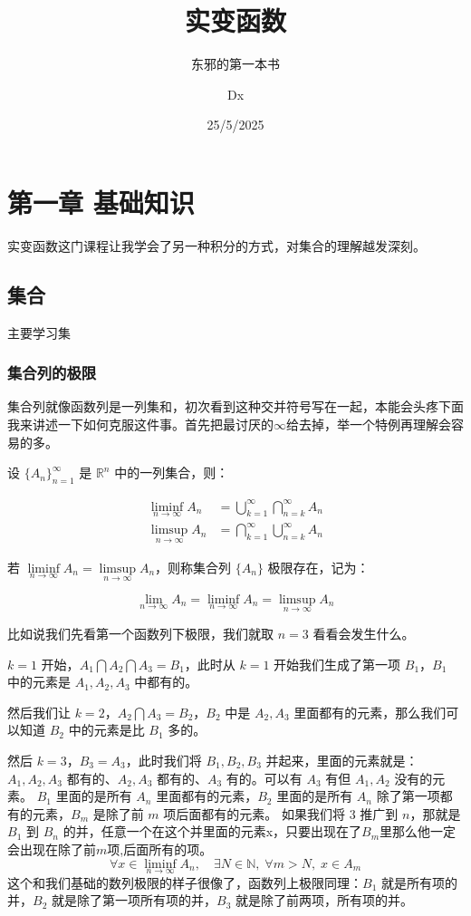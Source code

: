 \documentclass[lang=cn,10pt]{elegantbook}
\title{实变函数}
\subtitle{东邪的第一本书}
\author{Dx}
\date{25/5/2025}
\let\oldliminf\liminf
\renewcommand{\liminf}{\mathop{\oldliminf}\limits}
\let\oldlimsup\limsup
\renewcommand{\limsup}{\mathop{\oldlimsup}\limits}
\begin{document}
\maketitle
\frontmatter

\tableofcontents

\mainmatter

\chapter{第一章 基础知识}
实变函数这门课程让我学会了另一种积分的方式，对集合的理解越发深刻。



  
\section{集合}

主要学习集

\subsection{集合列的极限}
集合列就像函数列是一列集和，初次看到这种交并符号写在一起，本能会头疼下面我来讲述一下如何克服这件事。首先把最讨厌的$\infty$给去掉，举一个特例再理解会容易的多。
\begin{definition}
    设 $\{A_n\}_{n=1}^\infty$ 是 $\mathbb{R}^n$ 中的一列集合，则：

\begin{align*}
\liminf_{n \to \infty} A_n &= \bigcup_{k=1}^\infty \bigcap_{n = k}^\infty A_n \\[1em]
\limsup_{n \to \infty} A_n &= \bigcap_{k=1}^\infty \bigcup_{n = k}^\infty A_n
\end{align*}

若 $\liminf_{n \to \infty} A_n = \limsup_{n \to \infty} A_n$，则称集合列 $\{A_n\}$ 极限存在，记为：

\[
\lim_{n \to \infty} A_n = \liminf_{n \to \infty} A_n = \limsup_{n \to \infty} A_n
\]
\end{definition}
比如说我们先看第一个函数列下极限，我们就取 $n=3$ 看看会发生什么。

$k=1$ 开始，$A_1 \bigcap A_2 \bigcap A_3 = B_1$，此时从 $k=1$ 开始我们生成了第一项 $B_1$，$B_1$ 中的元素是 $A_1,A_2,A_3$ 中都有的。

然后我们让 $k=2$，$A_2 \bigcap A_3 = B_2$，$B_2$ 中是 $A_2,A_3$ 里面都有的元素，那么我们可以知道 $B_2$ 中的元素是比 $B_1$ 多的。

然后 $k=3$，$B_3 = A_3$，此时我们将 $B_1,B_2,B_3$ 并起来，里面的元素就是：$A_1,A_2,A_3$ 都有的、$A_2,A_3$ 都有的、$A_3$ 有的。可以有 $A_3$ 有但 $A_1,A_2$ 没有的元素。
$B_1$ 里面的是所有 $A_n$ 里面都有的元素，$B_2$ 里面的是所有 $A_n$ 除了第一项都有的元素，$B_m$ 是除了前 $m$ 项后面都有的元素。
如果我们将 $3$ 推广到 $n$，那就是 $B_1$ 到 $B_n$ 的并，任意一个在这个并里面的元素x，只要出现在了$B_m$里那么他一定会出现在除了前$m$项,后面所有的项。
\[
\forall x \in \liminf_{n \to \infty} A_n, \quad \exists N \in \mathbb{N}, \; \forall m > N, \; x \in A_m
\] 
这个和我们基础的数列极限的样子很像了，函数列上极限同理：$B_1$ 就是所有项的并，$B_2$ 就是除了第一项所有项的并，$B_3$ 就是除了前两项，所有项的并。
\end{document}
